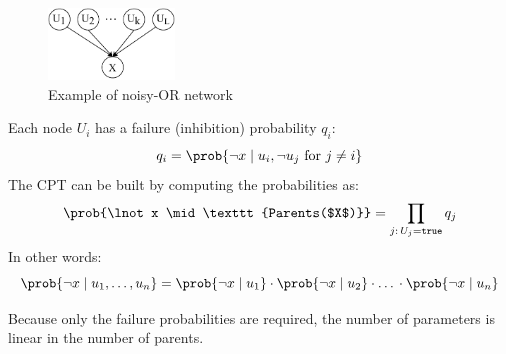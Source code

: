\begin{figure}[H]
    \centering
    \includegraphics[width=0.3\textwidth]{img/_noisy_or_example.pdf}
    \caption{Example of noisy-OR network}
\end{figure}

Each node $U_i$ has a failure (inhibition) probability $q_i$:
\[ q_i = \prob{\lnot x \mid u_i, \lnot u_j \text{ for } j \neq i} \]
The CPT can be built by computing the probabilities as:
\[ \prob{\lnot x \mid \texttt{Parents($X$)}} = \prod_{j:\, U_j = \texttt{true}} q_j \]
In other words:
\[ \prob{\lnot x \mid u_1, \dots, u_n} = 
    \prob{\lnot x \mid u_1} \cdot \prob{\lnot x \mid u_2} \cdot \text{\dots} \cdot \prob{\lnot x \mid u_n} \]

Because only the failure probabilities are required, the number of parameters is linear in the number of parents.

